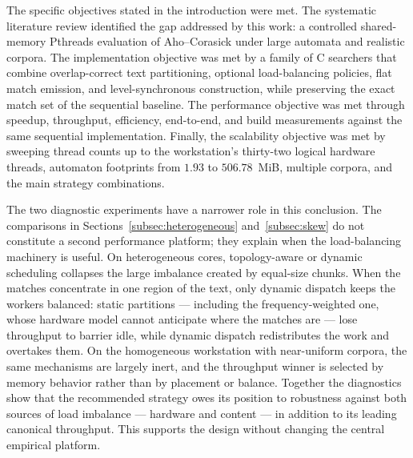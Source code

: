 The specific objectives stated in the introduction were met. The systematic
literature review identified the gap addressed by this work: a controlled
shared-memory Pthreads evaluation of Aho--Corasick under large automata and
realistic corpora. The implementation objective was met by a family of C
searchers that combine overlap-correct text partitioning, optional
load-balancing policies, flat match emission, and level-synchronous construction,
while preserving the exact match set of the sequential baseline. The performance
objective was met through speedup, throughput, efficiency, end-to-end, and build
measurements against the same sequential implementation. Finally, the scalability
objective was met by sweeping thread counts up to the workstation's thirty-two
logical hardware threads, automaton footprints from $1.93$ to $506.78$~MiB,
multiple corpora, and the main strategy combinations.

The two diagnostic experiments have a narrower role in this conclusion. The
comparisons in Sections~\ref{subsec:heterogeneous} and~\ref{subsec:skew} do not
constitute a second performance platform; they explain when the load-balancing
machinery is useful. On heterogeneous cores, topology-aware or dynamic
scheduling collapses the large imbalance created by equal-size chunks. When the
matches concentrate in one region of the text, only dynamic dispatch keeps the
workers balanced: static partitions --- including the frequency-weighted one,
whose hardware model cannot anticipate where the matches are --- lose throughput
to barrier idle, while dynamic dispatch redistributes the work and overtakes
them. On the homogeneous workstation with near-uniform corpora, the same
mechanisms are largely inert, and the throughput winner is selected by memory
behavior rather than by placement or balance. Together the diagnostics show that
the recommended strategy owes its position to robustness against both sources of
load imbalance --- hardware and content --- in addition to its leading canonical
throughput. This supports the design without changing the central empirical
platform.



